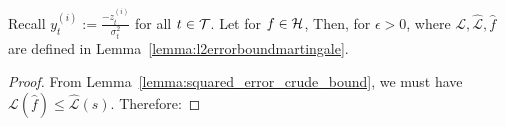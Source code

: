 \begin{lemma}\label{lemma:l2errorboundprob}
    Recall $y_t^{(i)}:= \frac{-z_t^{(i)}}{\sigma_t^2}$ for all $t \in \mathcal{T}$. Let for $f \in \mathcal{H}$, 
    Then, for $\epsilon > 0$, 
    where $\mathcal{L}, \widehat{\mathcal{L}}, \hat{f}$ are defined in Lemma~\ref{lemma:l2errorboundmartingale}.
\end{lemma}
\begin{proof}

From Lemma~\ref{lemma:squared_error_crude_bound}, we must have $\mathcal{L}(\hat{f}) \leq \hat{\mathcal{L}}(s)$. Therefore:
\end{proof}



